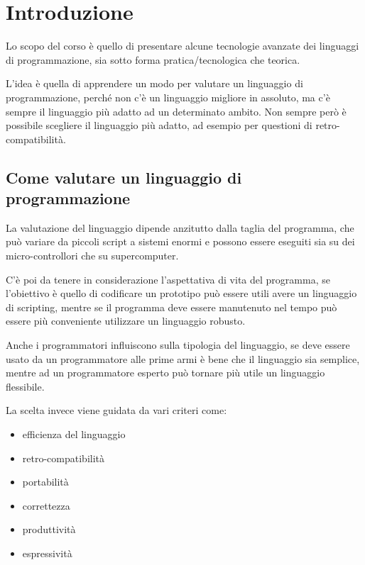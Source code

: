 

\chapter{Introduzione}

Lo scopo del corso è quello di presentare alcune tecnologie avanzate dei linguaggi di programmazione, sia sotto forma pratica/tecnologica che teorica.

L'idea è quella di apprendere un modo per valutare un linguaggio di programmazione, perché non c'è un linguaggio migliore in assoluto, ma c'è sempre il linguaggio più adatto ad un determinato ambito. Non sempre però è possibile scegliere il linguaggio più adatto, ad esempio per questioni di retro-compatibilità.

\section{Come valutare un linguaggio di programmazione}

La valutazione del linguaggio dipende anzitutto dalla taglia del programma, che può variare da piccoli script a sistemi enormi e possono essere eseguiti sia su dei micro-controllori che su supercomputer.

C'è poi da tenere in considerazione l'aspettativa di vita del programma, se l'obiettivo è quello di codificare un prototipo può essere utili avere un linguaggio di scripting, mentre se il programma deve essere manutenuto nel tempo può essere più conveniente utilizzare un linguaggio robusto.

Anche i programmatori influiscono sulla tipologia del linguaggio, se deve essere usato da un programmatore alle prime armi è bene che il linguaggio sia semplice, mentre ad un programmatore esperto può tornare più utile un linguaggio flessibile.

La scelta invece viene guidata da vari criteri come:

\begin{itemize}
	\item efficienza del linguaggio
	\item retro-compatibilità
	\item portabilità
	\item correttezza
	\item produttività
	\item espressività
\end{itemize}

